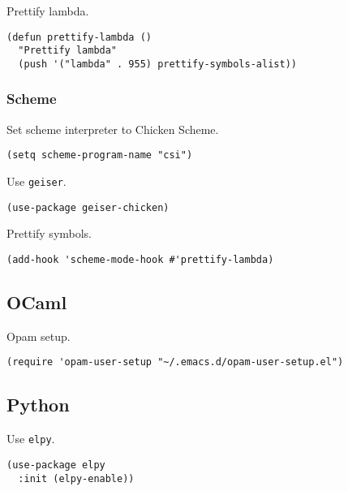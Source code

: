 \documentclass[11pt]{article}
\begin{document}
Prettify lambda.
\begin{verbatim}
(defun prettify-lambda ()
  "Prettify lambda"
  (push '("lambda" . 955) prettify-symbols-alist))
\end{verbatim}

\subsubsection{Scheme}
\label{sec:org0f81a96}
Set scheme interpreter to Chicken Scheme.
\begin{verbatim}
(setq scheme-program-name "csi")
\end{verbatim}

Use \texttt{geiser}.
\begin{verbatim}
(use-package geiser-chicken)
\end{verbatim}

Prettify symbols.
\begin{verbatim}
(add-hook 'scheme-mode-hook #'prettify-lambda)
\end{verbatim}

\subsection{OCaml}
\label{sec:org121d832}
Opam setup.
\begin{verbatim}
(require 'opam-user-setup "~/.emacs.d/opam-user-setup.el")
\end{verbatim}

\subsection{Python}
\label{sec:org52788e1}
Use \texttt{elpy}.
\begin{verbatim}
(use-package elpy
  :init (elpy-enable))
\end{verbatim}
\end{document}

